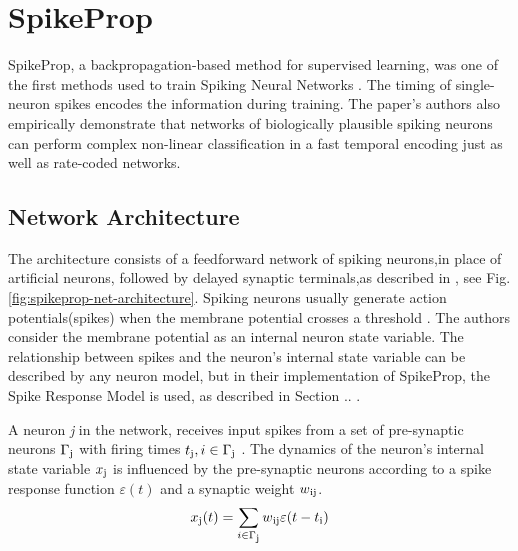 \documentclass[12pt]{report}
\begin{document}
\section{SpikeProp}
SpikeProp, a backpropagation-based method for supervised learning, was one of the first methods used to train Spiking Neural Networks \cite{Bohte2002}. The timing of single-neuron spikes encodes the information during training. The paper's authors also empirically demonstrate that networks of biologically plausible spiking neurons can perform complex non-linear classification in a fast temporal encoding just as well as rate-coded networks.
\subsection{Network Architecture}
The architecture consists of a feedforward network of spiking neurons,in place of artificial neurons, followed by delayed synaptic terminals,as described in \cite{ruf1998}, see Fig. \ref{fig:spikeprop-net-architecture}. Spiking neurons usually generate action potentials(spikes) when the membrane potential crosses a threshold . The authors consider the membrane potential as an internal neuron state variable. The relationship between spikes and the neuron's internal state variable can be described by any neuron model, but in their implementation of SpikeProp, the Spike Response Model is used, as described in Section .. .

A neuron \textit{j} in the network, receives input spikes from a set of pre-synaptic neurons \(\Gamma\textsubscript{j}\) with firing times \(t\textsubscript{j},i\in\Gamma\textsubscript{j}\) . The dynamics of the neuron's internal state variable \(x\textsubscript{j}\) is influenced by the pre-synaptic neurons according to a spike response function \(\varepsilon(t)\) and a synaptic weight \(w\textsubscript{ij}\).
\begin{equation}
    x\textsubscript{j}(t) = \sum_{i\in\Gamma\textsubscript{j}} w\textsubscript{ij}\varepsilon(t-t\textsubscript{i})
\end{equation}
\end{document}
